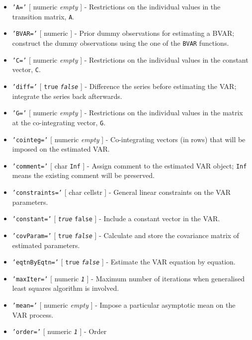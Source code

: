 \begin{itemize}
\item
  \texttt{'A='} {[} numeric \textbar{} \emph{empty} {]} - Restrictions
  on the individual values in the transition matrix, \texttt{A}.
\item
  \texttt{'BVAR='} {[} numeric {]} - Prior dummy observations for
  estimating a BVAR; construct the dummy observations using the one of
  the \texttt{BVAR} functions.
\item
  \texttt{'C='} {[} numeric \textbar{} \emph{empty} {]} - Restrictions
  on the individual values in the constant vector, \texttt{C}.
\item
  \texttt{'diff='} {[} \texttt{true} \textbar{} \emph{\texttt{false}}
  {]} - Difference the series before estimating the VAR; integrate the
  series back afterwards.
\item
  \texttt{'G='} {[} numeric \textbar{} \emph{empty} {]} - Restrictions
  on the individual values in the matrix at the co-integrating vector,
  \texttt{G}.
\item
  \texttt{'cointeg='} {[} numeric \textbar{} \emph{empty} {]} -
  Co-integrating vectors (in rows) that will be imposed on the estimated
  VAR.
\item
  \texttt{'comment='} {[} char \textbar{} \texttt{Inf} {]} - Assign
  comment to the estimated VAR object; \texttt{Inf} means the existing
  comment will be preserved.
\item
  \texttt{'constraints='} {[} char \textbar{} cellstr {]} - General
  linear constraints on the VAR parameters.
\item
  \texttt{'constant='} {[} \emph{\texttt{true}} \textbar{}
  \texttt{false} {]} - Include a constant vector in the VAR.
\item
  \texttt{'covParam='} {[} \texttt{true} \textbar{}
  \emph{\texttt{false}} {]} - Calculate and store the covariance matrix
  of estimated parameters.
\item
  \texttt{'eqtnByEqtn='} {[} \texttt{true} \textbar{}
  \emph{\texttt{false}} {]} - Estimate the VAR equation by equation.
\item
  \texttt{'maxIter='} {[} numeric \textbar{} \emph{\texttt{1}} {]} -
  Maximum number of iterations when generalised least squares algorithm
  is involved.
\item
  \texttt{'mean='} {[} numeric \textbar{} \emph{empty} {]} - Impose a
  particular asymptotic mean on the VAR process.
\item
  \texttt{'order='} {[} numeric \textbar{} \emph{\texttt{1}} {]} - Order

\end{itemize}
